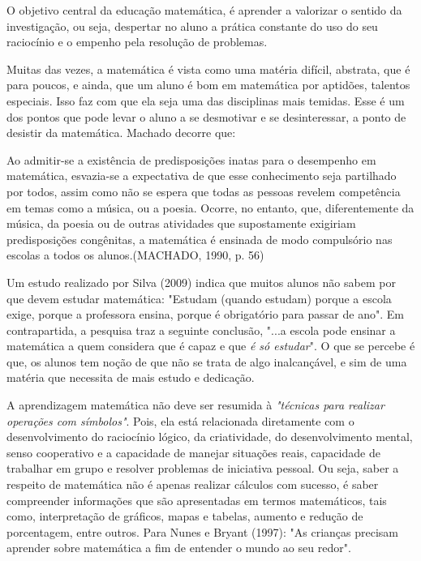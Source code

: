 \documentclass[brasil]{abnt}
\begin{document}
    O objetivo central da educação matemática, é aprender a valorizar o sentido da investigação, ou seja, despertar no aluno a prática constante do uso do seu raciocínio e o empenho pela resolução de problemas.
     
    Muitas das vezes, a matemática é vista como uma matéria difícil, abstrata, que é para poucos, e ainda, que um aluno é bom em matemática por aptidões,
    talentos especiais. Isso faz com que ela seja uma das disciplinas mais temidas. Esse é um dos pontos que pode levar o aluno a se desmotivar e se desinteressar, a ponto de desistir da matemática. 
    Machado decorre que:
    
		\begin{citacao}Ao admitir-se a existência de predisposições inatas para o desempenho em matemática, esvazia-se a expectativa de que esse conhecimento seja
					partilhado por todos, assim como não se espera que todas as pessoas revelem competência em temas como a música, ou a poesia. Ocorre, no entanto,
					que, diferentemente da música, da poesia ou de outras atividades que supostamente exigiriam predisposições congênitas, a matemática é ensinada de modo
					compulsório nas escolas a todos os alunos.(MACHADO, 1990, p. 56)
		\end{citacao}
		 
    Um estudo realizado por Silva (2009) indica que muitos alunos não sabem por que devem estudar matemática: "Estudam (quando estudam) porque a escola exige, porque a professora ensina, porque é 
    obrigatório para passar de ano". Em contrapartida, a pesquisa traz a seguinte conclusão, "...a escola pode ensinar a matemática a quem considera que é capaz e que \textit{é só estudar}". O que se percebe 
    é que, os alunos tem noção de que não se trata de algo inalcançável, e sim de uma matéria que necessita de mais estudo e dedicação.
	
	A aprendizagem matemática não deve ser resumida à \textit{"técnicas para realizar operações com símbolos"}. Pois, ela está relacionada diretamente com o desenvolvimento do raciocínio lógico, da 
	criatividade, do desenvolvimento mental, senso cooperativo e a capacidade de manejar situações reais, capacidade de trabalhar em grupo e resolver problemas de iniciativa pessoal. 
	Ou seja, saber a respeito de matemática não é apenas realizar cálculos com sucesso, é saber compreender informações que são apresentadas em termos matemáticos, tais como, interpretação de gráficos, 
	mapas e tabelas, aumento e redução de porcentagem, entre outros. Para Nunes e Bryant (1997): "As crianças precisam aprender sobre matemática a fim de entender o mundo ao seu redor".
			
\end{document}
